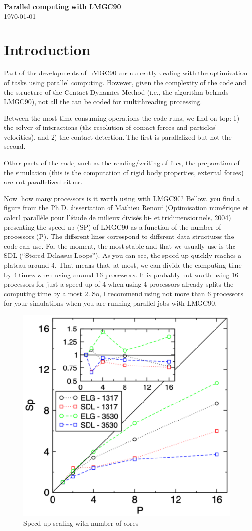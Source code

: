 \documentclass[12pt]{article}
\begin{document}
\thispagestyle{mypagestyle}

\begin{center}
  \textbf{\Large Parallel computing with LMGC90}\\
  \today
\end{center}

\section*{Introduction}
Part of the developments of LMGC90 are currently dealing with the optimization of tasks using parallel computing. However, given the complexity of the code and the structure of the Contact Dynamics Method (i.e., the algorithm behinds LMGC90), not all the can be coded for multithreading processing.

Between the most time-consuming operations the code runs, we find on top: 1) the solver of interactions (the resolution of contact forces and particles’ velocities), and 2) the contact detection. The first is parallelized but not the second.

Other parts of the code, such as the reading/writing of files, the preparation of the simulation (this is the computation of rigid body properties, external forces) are not parallelized either. 

Now, how many processors is it worth using with LMGC90? Bellow, you find a figure from the Ph.D. dissertation of Mathieu Renouf (Optimisation numérique et calcul parallèle pour l’étude de milieux divisés bi- et tridimensionnels, 2004) presenting the speed-up (SP) of LMGC90 as a function of the number of processors (P). 
The different lines correspond to different data structures the code can use. For the moment, the most stable and that we usually use is the SDL (“Stored Delassus Loops”). 
As you can see, the speed-up quickly reaches a plateau around 4. 
That means that, at most, we can divide the computing time by 4 times when using around 16 processors. It is probably not worth using 16 processors for just a speed-up of 4 when using 4 processors already splits the computing time by almost 2. 
So, I recommend using not more than 6 processors for your simulations when you are running parallel jobs with LMGC90. 

\begin{figure}
  \centering
  \includegraphics[width=0.5\linewidth]{figs/1_Scaling.pdf}
  \caption{Speed up scaling with number of cores}
\end{figure}
\end{document}
